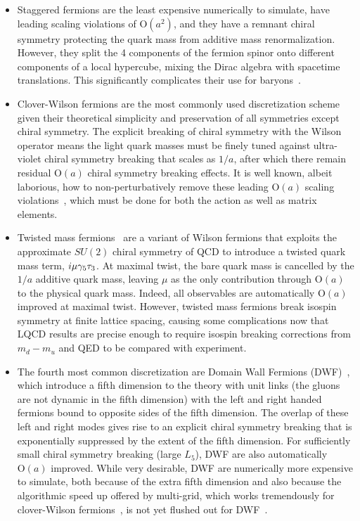 \begin{itemize}[leftmargin=*]
\item Staggered fermions are the least expensive numerically to simulate, have leading scaling violations of $\mathrm{O}(a^2)$, and they have a remnant chiral symmetry protecting the quark mass from additive mass renormalization.  However, they split the 4 components of the fermion spinor onto different components of a local hypercube, mixing the Dirac algebra with spacetime translations.  This significantly complicates their use for baryons~\addcite{}.

\item Clover-Wilson fermions are the most commonly used discretization scheme given their theoretical simplicity and preservation of all symmetries except chiral symmetry.  The explicit breaking of chiral symmetry with the Wilson operator means the light quark masses must be finely tuned against ultra-violet chiral symmetry breaking that scales as $1/a$, after which there remain residual $\mathrm{O}(a)$ chiral symmetry breaking effects.  It is well known, albeit laborious, how to non-perturbatively remove these leading $\mathrm{O}(a)$ scaling violations~\addcite{}, which must be done for both the action as well as matrix elements.

\item Twisted mass fermions~\addcite{} are a variant of Wilson fermions that exploits the approximate $SU(2)$ chiral symmetry of QCD to introduce a twisted quark mass term, $i\mu\gamma_5 \tau_3$.  At maximal twist, the bare quark mass is cancelled by the $1/a$ additive quark mass, leaving $\mu$ as the only contribution through $\mathrm{O}(a)$ to the physical quark mass.  Indeed, all observables are automatically $\mathrm{O}(a)$ improved at maximal twist.
However, twisted mass fermions break isospin symmetry at finite lattice spacing, causing some complications now that LQCD results are precise enough to require isospin breaking corrections from $m_d-m_u$ and QED to be compared with experiment.

\item The fourth most common discretization are Domain Wall Fermions (DWF)~\addcite{}, which introduce a fifth dimension to the theory with unit links (the gluons are not dynamic in the fifth dimension) with the left and right handed fermions bound to opposite sides of the fifth dimension.  The overlap of these left and right modes gives rise to an explicit chiral symmetry breaking that is exponentially suppressed by the extent of the fifth dimension.  For sufficiently small chiral symmetry breaking (large $L_5$), DWF are also automatically $\mathrm{O}(a)$ improved.
While very desirable, DWF are numerically more expensive to simulate, both because of the extra fifth dimension and also because the algorithmic speed up offered by multi-grid, which works tremendously for clover-Wilson fermions~, is not yet flushed out for DWF~.


\end{itemize}
